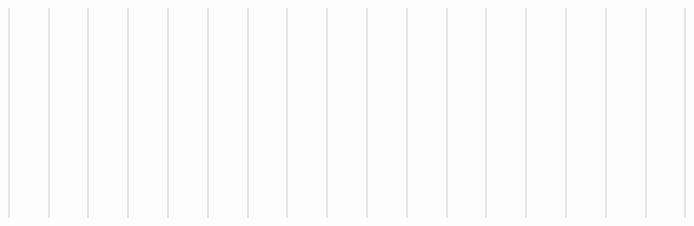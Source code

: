 \documentclass[letterpaper,10pt,english]{sphinxmanual}
\begin{document}
\begin{quote}
\begin{quote}
\begin{quote}
\begin{quote}
\begin{quote}
\begin{quote}
\begin{quote}
\begin{quote}
\begin{quote}
\begin{quote}
\begin{quote}
\begin{quote}
\begin{quote}
\begin{quote}
\begin{quote}
\begin{quote}
\begin{quote}
\begin{quote}
\begin{quote}
\begin{quote}
\begin{quote}
\begin{quote}
\begin{quote}
\begin{quote}
\begin{quote}
\begin{quote}
\begin{quote}
\begin{quote}
\begin{quote}
\begin{quote}
\begin{quote}
\begin{quote}
\begin{quote}
\begin{quote}
\begin{quote}
\begin{quote}
\begin{quote}
\begin{quote}
\begin{quote}
\begin{quote}
\begin{quote}
\begin{quote}
\begin{quote}
\begin{quote}
\begin{quote}
\begin{quote}
\begin{quote}
\begin{quote}
\begin{quote}
\begin{quote}
\begin{quote}
\begin{quote}
\begin{quote}
\begin{quote}
\begin{quote}
\begin{quote}
\begin{quote}
\begin{quote}
\begin{quote}
\begin{quote}
\begin{quote}
\begin{quote}
\begin{quote}
\begin{quote}
\begin{quote}
\begin{quote}
\begin{quote}
\begin{quote}
\begin{quote}
\begin{quote}
\begin{quote}
\begin{quote}
\begin{quote}
\begin{quote}
\begin{quote}
\begin{quote}
\begin{quote}
\begin{quote}
\begin{quote}
\begin{quote}
\begin{quote}
\begin{quote}
\begin{quote}
\begin{quote}
\begin{quote}
\begin{quote}
\begin{quote}
\begin{quote}
\begin{quote}
\begin{quote}
\begin{quote}
\begin{quote}
\begin{quote}
\begin{savenotes}
\begin{longtable}[c]{|||}
\begin{savenotes}
\begin{longtable}[c]{|||||||}
\begin{savenotes}
\end{savenotes}
\end{longtable}
\end{savenotes}
\end{longtable}
\end{savenotes}
\end{quote}
\end{quote}
\end{quote}
\end{quote}
\end{quote}
\end{quote}
\end{quote}
\end{quote}
\end{quote}
\end{quote}
\end{quote}
\end{quote}
\end{quote}
\end{quote}
\end{quote}
\end{quote}
\end{quote}
\end{quote}
\end{quote}
\end{quote}
\end{quote}
\end{quote}
\end{quote}
\end{quote}
\end{quote}
\end{quote}
\end{quote}
\end{quote}
\end{quote}
\end{quote}
\end{quote}
\end{quote}
\end{quote}
\end{quote}
\end{quote}
\end{quote}
\end{quote}
\end{quote}
\end{quote}
\end{quote}
\end{quote}
\end{quote}
\end{quote}
\end{quote}
\end{quote}
\end{quote}
\end{quote}
\end{quote}
\end{quote}
\end{quote}
\end{quote}
\end{quote}
\end{quote}
\end{quote}
\end{quote}
\end{quote}
\end{quote}
\end{quote}
\end{quote}
\end{quote}
\end{quote}
\end{quote}
\end{quote}
\end{quote}
\end{quote}
\end{quote}
\end{quote}
\end{quote}
\end{quote}
\end{quote}
\end{quote}
\end{quote}
\end{quote}
\end{quote}
\end{quote}
\end{quote}
\end{quote}
\end{quote}
\end{quote}
\end{quote}
\end{quote}
\end{quote}
\end{quote}
\end{quote}
\end{quote}
\end{quote}
\end{quote}
\end{quote}
\end{quote}
\end{quote}
\end{quote}
\end{quote}
\end{quote}
\end{document}
